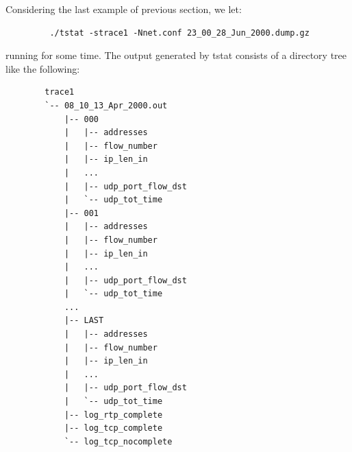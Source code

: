 \documentclass[11pt]{article}
\begin{document}
Considering the last example of previous section, we let:

\begin{small}\begin{verbatim}
         ./tstat -strace1 -Nnet.conf 23_00_28_Jun_2000.dump.gz
\end{verbatim}\end{small} \noindent
running for some time. The output generated by tstat consists of a directory 
tree like the following:

\begin{small}\begin{verbatim}
        trace1
        `-- 08_10_13_Apr_2000.out
            |-- 000
            |   |-- addresses
            |   |-- flow_number
            |   |-- ip_len_in
            |   ...
            |   |-- udp_port_flow_dst
            |   `-- udp_tot_time
            |-- 001
            |   |-- addresses
            |   |-- flow_number
            |   |-- ip_len_in
            |   ...
            |   |-- udp_port_flow_dst
            |   `-- udp_tot_time
            ...
            |-- LAST
            |   |-- addresses
            |   |-- flow_number
            |   |-- ip_len_in
            |   ...
            |   |-- udp_port_flow_dst
            |   `-- udp_tot_time
            |-- log_rtp_complete
            |-- log_tcp_complete
            `-- log_tcp_nocomplete
\end{verbatim}\end{small} \noindent
\end{document}
